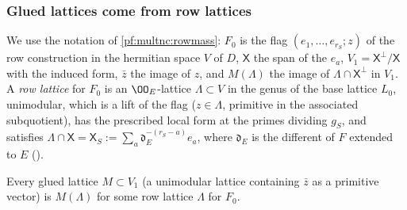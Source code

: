 \subsubsection*{Glued lattices come from row lattices}

We use the notation of \cref{pf:multnc:rowmass}: $F_0$ is the flag $(e_1,\dots,e_{r_S};z)$ of the row construction in the
hermitian space $V$ of $D$, $\mathsf X$ the span of the $e_a$, $V_1=\mathsf X^\perp/\mathsf X$ with the induced form,
$\bar z$ the image of $z$, and $M(\Lambda)$ the image of $\Lambda\cap\mathsf X^\perp$ in $V_1$. A \emph{row lattice} for
$F_0$ is an $\OO_E$-lattice $\Lambda\subset V$ in the genus of the base lattice $L_0$, unimodular, which is a lift of the flag
($z\in\Lambda$, primitive in the associated subquotient), has the prescribed local form at the primes dividing $g_S$, and
satisfies $\Lambda\cap\mathsf X=\mathsf X_S:=\sum_a\mathfrak d_E^{-(r_S-a)}e_a$, where $\mathfrak d_E$ is the different of $F$
extended to $E$ ().

\begin{proposition}\label{pf:multnc:rowsurj}
Every glued lattice $M\subset V_1$ (a unimodular lattice containing $\bar z$ as a primitive vector) is $M(\Lambda)$ for some
row lattice $\Lambda$ for $F_0$.
\end{proposition}

